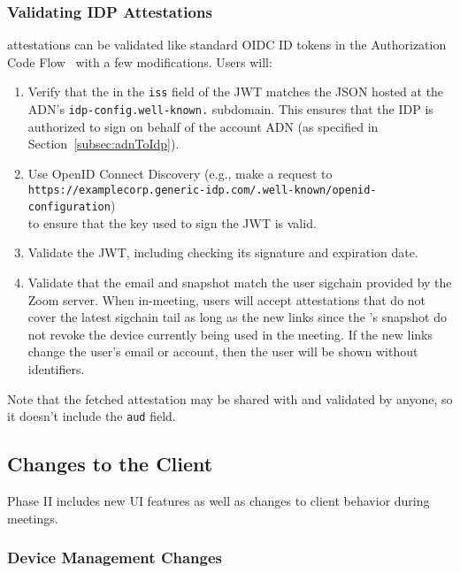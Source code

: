 \subsubsection{Validating IDP Attestations}

\idp attestations can be validated like standard OIDC ID tokens in the Authorization Code
Flow~\cite{oidc} with a few modifications. Users will:

\begin{enumerate}
\item Verify that the \idp in the \texttt{iss} field of the JWT matches the JSON hosted at the ADN's
    \texttt{idp-config.well-known.} subdomain. This ensures that the IDP is authorized to sign on
    behalf of the account ADN (as specified in Section~\ref{subsec:adnToIdp}).
\item Use OpenID Connect Discovery (e.g., make a request to \\
    \texttt{https://examplecorp.generic-idp.com/.well-known/openid-configuration}) \\ to ensure that the key
    used to sign the JWT is valid.
\item Validate the JWT, including checking its signature and expiration date.
\item Validate that the email and snapshot match the user sigchain provided by the Zoom server. When
    in-meeting, users will accept attestations that do not cover the latest sigchain tail as long as
    the new links since the {\idp}'s snapshot do not revoke the device currently being used in
    the meeting. If the new links change the user's email or account, then the user will be
    shown without identifiers.
\end{enumerate}

Note that the fetched attestation may be shared with and validated by anyone, so it doesn't include
the \texttt{aud} field.

\subsection{Changes to the Client}
\label{subsec:clientchanges}

Phase II includes new UI features as well as changes to client behavior during meetings.

\subsubsection{Device Management Changes}

